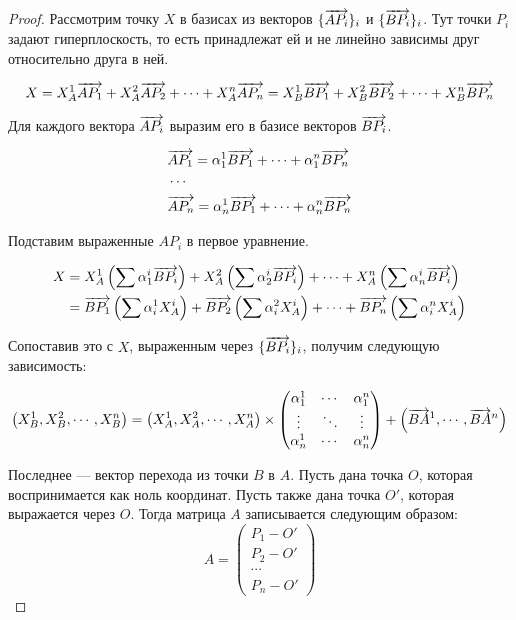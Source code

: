 \documentclass[11pt]{article}
\begin{document}
\begin{proof}

Рассмотрим точку $X$ в базисах из векторов $\{\overrightarrow{AP_i}\}_i$ и
$\{\overrightarrow{BP_i}\}_i$. Тут точки ${P_i}$ задают гиперплоскость, то есть
принадлежат ей и не линейно зависимы друг относительно друга в ней.

\[
X = X_A^1\overrightarrow{A P_1} +
    X_A^2\overrightarrow{A P_2} +
    \cdots +
    X_A^n\overrightarrow{A P_n}
  = X_B^1\overrightarrow{B P_1} +
    X_B^2\overrightarrow{B P_2} +
    \cdots +
    X_B^n\overrightarrow{B P_n}
\]

Для каждого вектора $\overrightarrow{AP_i}$ выразим его в базисе векторов
${\overrightarrow{BP_i}}$.

\begin{align*}
&\overrightarrow{AP_1} =
       \alpha_1^1\overrightarrow{B P_1} +
       \cdots +
       \alpha_1^n\overrightarrow{B P_n}\\
&\cdots \\
&\overrightarrow{AP_n} =
       \alpha_n^1\overrightarrow{B P_1} +
       \cdots +
       \alpha_n^n\overrightarrow{B P_n}
\end{align*}

Подставим выраженные $AP_i$ в первое уравнение.

\begin{align*}
X &= X_A^1\left(\sum\alpha_1^i\overrightarrow{BP_i}\right) +
     X_A^2\left(\sum\alpha_2^i\overrightarrow{BP_i}\right) +
     \cdots +
     X_A^n\left(\sum\alpha_n^i\overrightarrow{B P_i}\right) \\
  &= \overrightarrow{BP_1} \left(\sum\alpha_i^1X_A^i\right) +
     \overrightarrow{BP_2} \left(\sum\alpha_i^2X^i_A\right) +
     \cdots +
     \overrightarrow{BP_n} \left(\sum\alpha_i^nX_A^i\right)
\end{align*}

Сопоставив это с $X$, выраженным через $\{\overrightarrow{BP_i}\}_i$,
получим следующую зависимость:

\begin{align*}
  \left(X_B^1,X_B^2,\cdots,X_B^n\right)
= \left(X_A^1,X_A^2,\cdots,X_A^n\right)
  \times
  \begin{pmatrix}
   \alpha_1^1 & \cdots & \alpha_1^n \\
   \vdots     & \ddots & \vdots     \\
   \alpha_n^1 & \cdots & \alpha_n^n
  \end{pmatrix}
+ \left(\overrightarrow{BA}^1,\cdots,\overrightarrow{BA}^n\right)
\end{align*}

Последнее --- вектор перехода из точки $B$ в $A$.
Пусть дана точка $O$, которая воспринимается как ноль координат. Пусть
также дана точка $O'$, которая выражается через $O$.
Тогда матрица $A$ записывается следующим образом:
\[
A =
\begin{pmatrix}
  P_1 - O' \\
  P_2 - O' \\
  \cdots  \\
  P_n - O'
\end{pmatrix}
\]


\end{proof}
\end{document}
